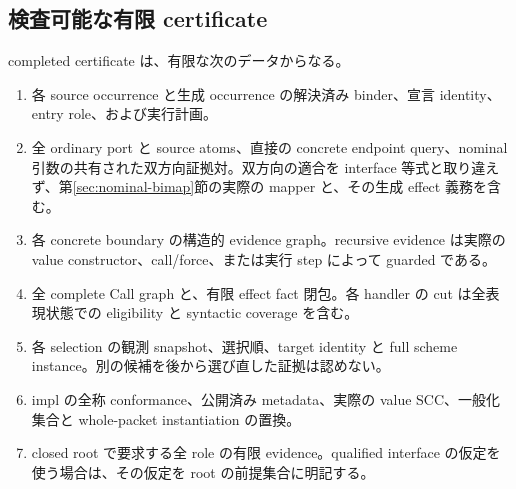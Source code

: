 \documentclass[11pt,a4paper]{article}
\theoremstyle{remark}
\begin{document}
\subsection{検査可能な有限 certificate}

completed certificate は、有限な次のデータからなる。
\begin{enumerate}
\item 各 source occurrence と生成 occurrence の解決済み binder、宣言 identity、entry role、および実行計画。
\item 全 ordinary port と source atoms、直接の concrete endpoint query、nominal 引数の共有された双方向証拠対。双方向の適合を interface 等式と取り違えず、第\ref{sec:nominal-bimap}節の実際の mapper と、その生成 effect 義務を含む。
\item 各 concrete boundary の構造的 evidence graph。recursive evidence は実際の value constructor、call/force、または実行 step によって guarded である。
\item 全 complete Call graph と、有限 effect fact 閉包。各 handler の cut は全表現状態での eligibility と syntactic coverage を含む。
\item 各 selection の観測 snapshot、選択順、target identity と full scheme instance。別の候補を後から選び直した証拠は認めない。
\item impl の全称 conformance、公開済み metadata、実際の value SCC、一般化集合と whole-packet instantiation の置換。
\item closed root で要求する全 role の有限 evidence。qualified interface の仮定を使う場合は、その仮定を root の前提集合に明記する。
\end{enumerate}
\end{document}
